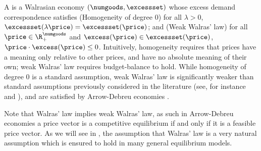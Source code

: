 A  is a Walrasian economy $(\numgoods, \excessset)$ whose excess demand correspondence satisfies (Homogeneity of degree $0$) for all $\lambda >0$, $\excessset(\lambda \price) = \excessset(\price)$; and (Weak Walras' law) for all $\price \in \R^\numgoods_+$ and $\excess(\price) \in \excessset(\price)$,  $\price \cdot \excess(\price) \leq 0$.
% 
Intuitively, homogeneity requires that prices have a meaning only relative to other prices, and have no absolute meaning of their own; weak Walras' law requires budget-balance to hold. While homogeneity of degree 0 is a standard assumption, weak Walras' law is significantly weaker than standard assumptions previously considered in the literature (see, for instance \citet{arrow-hurwicz} and \citet{debreu1974excess}), and are satisfied by Arrow-Debreu economies \cite{arrow-debreu}.







\begin{remark}
    Note that Walras' law implies weak Walras' law, as such in Arrow-Debreu economies a price vector is a competitive equilibrium if and only if it is a feasible price vector. As we will see in , the assumption that Walras' law is a very natural assumption which is ensured to hold in many general equilibrium models.
\end{remark}
\fi 


